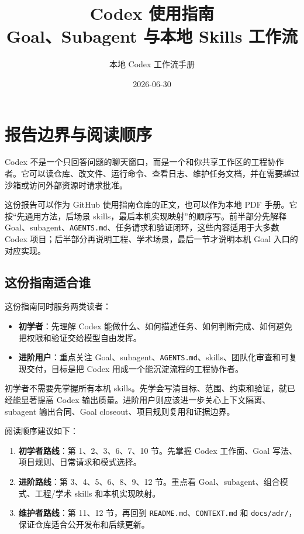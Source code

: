 \documentclass[UTF8,a4paper,11pt,fontset=none]{ctexart}
\title{\textbf{Codex 使用指南}\\{\large Goal、Subagent 与本地 Skills 工作流}}
\author{本地 Codex 工作流手册}
\date{2026-06-30}
\newcommand{\file}[1]{\texttt{#1}}
\newcommand{\keypoint}[1]{\textbf{#1}}
\begin{document}
\maketitle
\thispagestyle{empty}
\newpage
\tableofcontents
\newpage

\section{报告边界与阅读顺序}

Codex 不是一个只回答问题的聊天窗口，而是一个和你共享工作区的工程协作者。它可以读仓库、改文件、运行命令、查看日志、维护任务文档，并在需要越过沙箱或访问外部资源时请求批准。

这份报告可以作为 GitHub 使用指南仓库的正文，也可以作为本地 PDF 手册。它按“先通用方法，后场景 skills，最后本机实现映射”的顺序写。前半部分先解释 Goal、subagent、\file{AGENTS.md}、任务请求和验证闭环，这些内容适用于大多数 Codex 项目；后半部分再说明工程、学术场景，最后一节才说明本机 Goal 入口的对应实现。

\subsection{这份指南适合谁}

这份指南同时服务两类读者：

\begin{itemize}
  \item \keypoint{初学者}：先理解 Codex 能做什么、如何描述任务、如何判断完成、如何避免把权限和验证交给模型自由发挥。
  \item \keypoint{进阶用户}：重点关注 Goal、subagent、\file{AGENTS.md}、skills、团队化审查和可复现交付，目标是把 Codex 用成一个能沉淀流程的工程协作者。
\end{itemize}

初学者不需要先掌握所有本机 skills。先学会写清目标、范围、约束和验证，就已经能显著提高 Codex 输出质量。进阶用户则应该进一步关心上下文隔离、subagent 输出合同、Goal closeout、项目规则复用和证据边界。

阅读顺序建议如下：

\begin{enumerate}
  \item \keypoint{初学者路线}：第 1、2、3、6、7、10 节。先掌握 Codex 工作面、Goal 写法、项目规则、日常请求和模式选择。
  \item \keypoint{进阶路线}：第 3、4、5、6、8、9、12 节。重点看 Goal、subagent、组合模式、工程/学术 skills 和本机实现映射。
  \item \keypoint{维护者路线}：第 11、12 节，再回到 \file{README.md}、\file{CONTEXT.md} 和 \file{docs/adr/}，保证仓库适合公开发布和后续更新。
\end{enumerate}
\end{document}

